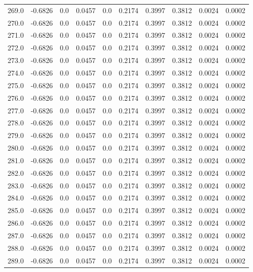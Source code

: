 \begin{longtable}{lrrrrrrrrr}
269.0 & -0.6826 & 0.0 & 0.0457 & 0.0 & 0.2174 & 0.3997 & 0.3812 & 0.0024 & 0.0002 \\
270.0 & -0.6826 & 0.0 & 0.0457 & 0.0 & 0.2174 & 0.3997 & 0.3812 & 0.0024 & 0.0002 \\
271.0 & -0.6826 & 0.0 & 0.0457 & 0.0 & 0.2174 & 0.3997 & 0.3812 & 0.0024 & 0.0002 \\
272.0 & -0.6826 & 0.0 & 0.0457 & 0.0 & 0.2174 & 0.3997 & 0.3812 & 0.0024 & 0.0002 \\
273.0 & -0.6826 & 0.0 & 0.0457 & 0.0 & 0.2174 & 0.3997 & 0.3812 & 0.0024 & 0.0002 \\
274.0 & -0.6826 & 0.0 & 0.0457 & 0.0 & 0.2174 & 0.3997 & 0.3812 & 0.0024 & 0.0002 \\
275.0 & -0.6826 & 0.0 & 0.0457 & 0.0 & 0.2174 & 0.3997 & 0.3812 & 0.0024 & 0.0002 \\
276.0 & -0.6826 & 0.0 & 0.0457 & 0.0 & 0.2174 & 0.3997 & 0.3812 & 0.0024 & 0.0002 \\
277.0 & -0.6826 & 0.0 & 0.0457 & 0.0 & 0.2174 & 0.3997 & 0.3812 & 0.0024 & 0.0002 \\
278.0 & -0.6826 & 0.0 & 0.0457 & 0.0 & 0.2174 & 0.3997 & 0.3812 & 0.0024 & 0.0002 \\
279.0 & -0.6826 & 0.0 & 0.0457 & 0.0 & 0.2174 & 0.3997 & 0.3812 & 0.0024 & 0.0002 \\
280.0 & -0.6826 & 0.0 & 0.0457 & 0.0 & 0.2174 & 0.3997 & 0.3812 & 0.0024 & 0.0002 \\
281.0 & -0.6826 & 0.0 & 0.0457 & 0.0 & 0.2174 & 0.3997 & 0.3812 & 0.0024 & 0.0002 \\
282.0 & -0.6826 & 0.0 & 0.0457 & 0.0 & 0.2174 & 0.3997 & 0.3812 & 0.0024 & 0.0002 \\
283.0 & -0.6826 & 0.0 & 0.0457 & 0.0 & 0.2174 & 0.3997 & 0.3812 & 0.0024 & 0.0002 \\
284.0 & -0.6826 & 0.0 & 0.0457 & 0.0 & 0.2174 & 0.3997 & 0.3812 & 0.0024 & 0.0002 \\
285.0 & -0.6826 & 0.0 & 0.0457 & 0.0 & 0.2174 & 0.3997 & 0.3812 & 0.0024 & 0.0002 \\
286.0 & -0.6826 & 0.0 & 0.0457 & 0.0 & 0.2174 & 0.3997 & 0.3812 & 0.0024 & 0.0002 \\
287.0 & -0.6826 & 0.0 & 0.0457 & 0.0 & 0.2174 & 0.3997 & 0.3812 & 0.0024 & 0.0002 \\
288.0 & -0.6826 & 0.0 & 0.0457 & 0.0 & 0.2174 & 0.3997 & 0.3812 & 0.0024 & 0.0002 \\
289.0 & -0.6826 & 0.0 & 0.0457 & 0.0 & 0.2174 & 0.3997 & 0.3812 & 0.0024 & 0.0002 \\

\end{longtable}
